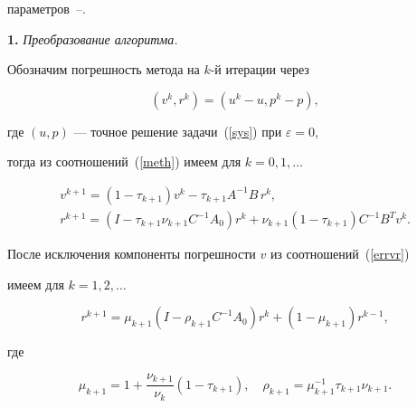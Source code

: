 параметров~\cite{Tem1}--\cite{Chiz}.


\medskip





{\bf 1.} {\it Преобразование алгоритма.}


Обозначим погрешность метода на $k$-й итерации через


$$


(v^k, r^k) = ( u^k - u, p^k -p ),


$$


где $(u,p)$ --- точное решение задачи~(\ref{sys}) при $ \varepsilon = 0$,


тогда из соотношений~(\ref{meth}) имеем для $ k = 0, 1, \dotsc$


\begin{equation}


\label{errvr}


\begin{array}{c}


v^{k+1} = ( 1 - \tau_{k+1}) v^k - \tau_{k+1} A^{-1} B\, r^{k}, \\


r^{k+1} = ( I - \tau_{k+1} \nu_{k+1} C^{-1}A_0)r^k +


\nu_{k+1} ( 1 - \tau_{k+1} ) C^{-1} B^T v^{k}.


\end{array}


\end{equation}





После исключения компоненты погрешности $v$ из соотношений~(\ref{errvr})


имеем для $k = 1, 2, \dotsc$


\begin{equation}


\label{err2}


r^{k+1}=\mu_{k+1}(I-\rho_{k+1} C^{-1}A_0)r^k+(1- \mu_{k+1} ) r^{k-1},


\end{equation}


где


\begin{equation}


\label{parerr2}


\mu_{k+1} = 1 + \dfrac{\nu_{k+1}}{\nu_{k}} ( 1 - \tau_{k+1} ) , \quad


\rho_{k+1} = \mu_{k+1}^{-1} \tau_{k+1} \nu_{k+1}.


\end{equation}


